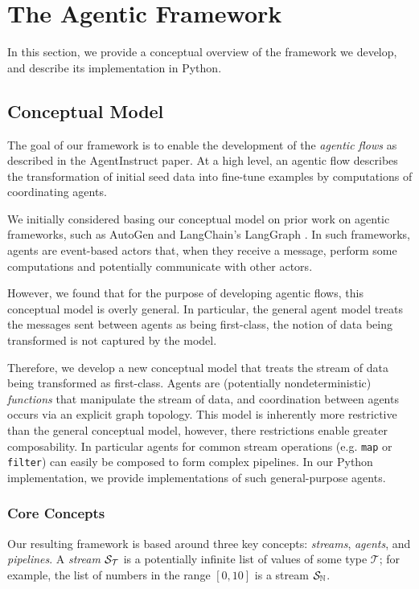 \section{The Agentic Framework}

In this section, we provide a conceptual overview of the framework we develop,
and describe its implementation in Python.

\subsection{Conceptual Model}

The goal of our framework is to enable the development of the \emph{agentic
flows} as described in the AgentInstruct \citep{mitra_agentinstruct_2024} paper.
At a high level, an agentic flow describes the transformation of initial seed
data into fine-tune examples by computations of coordinating agents.

We initially considered basing our conceptual model on prior work on agentic
frameworks, such as AutoGen \cite{wu2023autogenenablingnextgenllm} and
LangChain's LangGraph \cite{langchain}. In such frameworks, agents are
event-based actors that, when they receive a message, perform some computations
and potentially communicate with other actors.

However, we found that for the purpose of developing agentic flows, this
conceptual model is overly general. In particular, the general agent model
treats the messages sent between agents as being first-class, the notion of data
being transformed is not captured by the model.

Therefore, we develop a new conceptual model that treats the stream of data
being transformed as first-class. Agents are (potentially nondeterministic)
\emph{functions} that manipulate the stream of data, and coordination between
agents occurs via an explicit graph topology. This model is inherently more
restrictive than the general conceptual model, however, there restrictions
enable greater composability. In particular agents for common stream operations
(e.g. \texttt{map} or \texttt{filter}) can easily be composed to form complex
pipelines. In our Python implementation, we provide implementations of such
general-purpose agents.

\subsubsection{Core Concepts}

Our resulting framework is based around three key concepts: \emph{streams},
\emph{agents}, and \emph{pipelines}. A \emph{stream} $\mathcal{S}_{\mathcal{T}}$ is a
potentially infinite list of values of some type $\mathcal{T}$; for example, the
list of numbers in the range $[0, 10]$ is a stream $\mathcal{S}_{\mathbb{N}}$.

